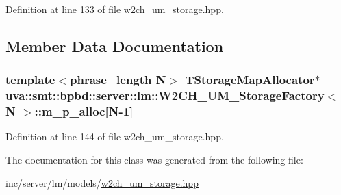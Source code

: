 Definition at line 133 of file w2ch\+\_\+um\+\_\+storage.\+hpp.



\subsection{Member Data Documentation}
\hypertarget{classuva_1_1smt_1_1bpbd_1_1server_1_1lm_1_1_w2_c_h___u_m___storage_factory_a2191bc31eb8246da200e8c39a353c0f8}{}
\subsubsection[{m\+\_\+p\+\_\+alloc}]{\setlength{\rightskip}{0pt plus 5cm}template$<$phrase\+\_\+length N$>$ {\bf T\+Storage\+Map\+Allocator}$\ast$ {\bf uva\+::smt\+::bpbd\+::server\+::lm\+::\+W2\+C\+H\+\_\+\+U\+M\+\_\+\+Storage\+Factory}$<$ N $>$\+::m\+\_\+p\+\_\+alloc\mbox{[}N-\/1\mbox{]}\hspace{0.3cm}{\ttfamily [protected]}}\label{classuva_1_1smt_1_1bpbd_1_1server_1_1lm_1_1_w2_c_h___u_m___storage_factory_a2191bc31eb8246da200e8c39a353c0f8}


Definition at line 144 of file w2ch\+\_\+um\+\_\+storage.\+hpp.



The documentation for this class was generated from the following file\+:\begin{DoxyCompactItemize}
\item 
inc/server/lm/models/\hyperlink{w2ch__um__storage_8hpp}{w2ch\+\_\+um\+\_\+storage.\+hpp}\end{DoxyCompactItemize}

